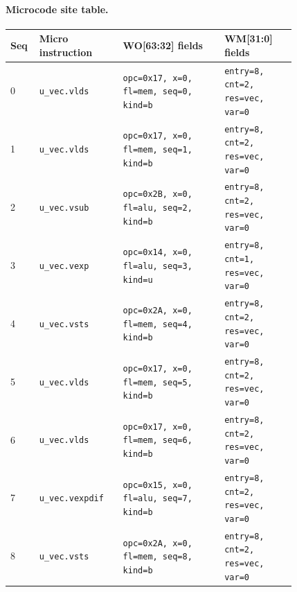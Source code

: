 \paragraph{Microcode site table.}
{\scriptsize
\begin{longtable}{@{}R{0.055\linewidth}L{0.23\linewidth}L{0.31\linewidth}L{0.22\linewidth}@{}}
\toprule
Seq & Micro instruction & WO[63:32] fields & WM[31:0] fields \\
 & \texttt{u\_vec.vlds} & \texttt{opc=0x17, x=0, fl=mem, seq=0, kind=b} & \texttt{entry=8, cnt=2, res=vec, var=0} \\
1 & \texttt{u\_vec.vlds} & \texttt{opc=0x17, x=0, fl=mem, seq=1, kind=b} & \texttt{entry=8, cnt=2, res=vec, var=0} \\
2 & \texttt{u\_vec.vsub} & \texttt{opc=0x2B, x=0, fl=alu, seq=2, kind=b} & \texttt{entry=8, cnt=2, res=vec, var=0} \\
3 & \texttt{u\_vec.vexp} & \texttt{opc=0x14, x=0, fl=alu, seq=3, kind=u} & \texttt{entry=8, cnt=1, res=vec, var=0} \\
4 & \texttt{u\_vec.vsts} & \texttt{opc=0x2A, x=0, fl=mem, seq=4, kind=b} & \texttt{entry=8, cnt=2, res=vec, var=0} \\
5 & \texttt{u\_vec.vlds} & \texttt{opc=0x17, x=0, fl=mem, seq=5, kind=b} & \texttt{entry=8, cnt=2, res=vec, var=0} \\
6 & \texttt{u\_vec.vlds} & \texttt{opc=0x17, x=0, fl=mem, seq=6, kind=b} & \texttt{entry=8, cnt=2, res=vec, var=0} \\
7 & \texttt{u\_vec.vexpdif} & \texttt{opc=0x15, x=0, fl=alu, seq=7, kind=b} & \texttt{entry=8, cnt=2, res=vec, var=0} \\
8 & \texttt{u\_vec.vsts} & \texttt{opc=0x2A, x=0, fl=mem, seq=8, kind=b} & \texttt{entry=8, cnt=2, res=vec, var=0} \\
\bottomrule
\end{longtable}
}
